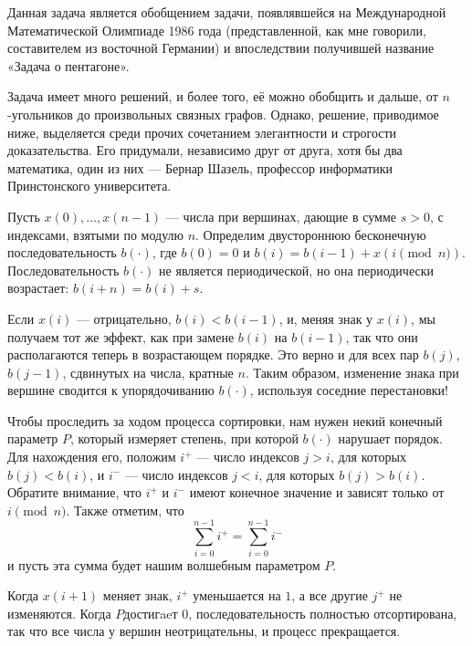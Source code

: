 Данная задача является обобщением задачи, появлявшейся на Международной Математической Олимпиаде 1986 года (представленной, как мне говорили, составителем из восточной Германии) и впоследствии получившей название «Задача о пентагоне».

Задача имеет много решений, и более того, её можно обобщить и дальше, от $n$-угольников до произвольных связных графов.
Однако, решение, приводимое ниже, выделяется среди прочих сочетанием элегантности и строгости доказательства.
Его придумали, независимо друг от друга, хотя бы два математика, один из них --- Бернар Шазель, профессор информатики Принстонского университета. %

\medskip

Пусть $x(0),\dots,x(n-1)$ --- числа при вершинах, дающие в сумме $s > 0$, с индексами, взятыми по модулю $n$.
Определим двустороннюю бесконечную последовательность
$b(\cdot)$, где $b(0) = 0$ и $b(i) = b(i -1) + x(i \pmod{n})$.
Последовательность $b(\cdot)$ не является периодической, но она периодически возрастает: $b(i + n) = b(i) + s$.

Если $x(i)$ --- отрицательно, $b(i) < b(i-1)$, и, меняя знак у $x(i)$, мы получаем тот же эффект, как при замене $b(i)$ на $b(i - 1)$, так что они располагаются теперь в возрастающем порядке.
Это верно и для всех пар $b(j)$, $b(j - 1)$, сдвинутых на числа, кратные $n$.
Таким образом, изменение знака при вершине сводится к упорядочиванию $b(\cdot)$, используя соседние перестановки!

Чтобы проследить за ходом процесса сортировки, нам нужен некий конечный параметр $P$, который измеряет степень, при которой $b(\cdot)$ нарушает порядок. %
Для нахождения его, положим $i^+$ --- число индексов $j > i$, для которых $b(j) < b(i)$, и $i^-$ --- число индексов $j < i$, для которых $b(j) > b(i)$.
Обратите внимание, что $i^+$ и $i^-$ имеют конечное значение и зависят только от $i \pmod n$.
Также отметим, что 
\[\sum_{i=0}^{n-1}i^+=\sum_{i=0}^{n-1}i^-\]
и пусть эта сумма будет нашим волшебным параметром $P$.

Когда $x(i+1)$ меняет знак, $i^+$ уменьшается на $1$, а все другие $j^+$ не изменяются.
Когда $P $достигaeт $0$, последовательность полностью отсортирована, так что все числа у вершин неотрицательны, и процесс прекращается.

